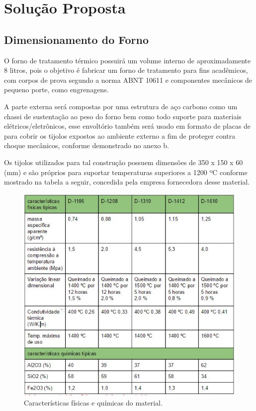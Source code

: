 \chapter[Solução Proposta]{Solução Proposta}


\section{Dimensionamento do Forno}

O forno de tratamento térmico possuirá um volume interno de aproximadamente 8 litros, pois o objetivo é fabricar um forno de tratamento para fins acadêmicos, com corpos de prova segundo a norma ABNT 10611 e componentes mecânicos de pequeno porte, como engrenagens.
 
A parte externa será compostas por uma estrutura de aço carbono como um chassi de sustentação ao peso do forno bem como todo suporte para materiais elétricos/eletrônicos, esse envoltório também será usado em formato de placas de para cobrir os tijolos expostos ao ambiente externo a fim de proteger contra choque mecânicos, conforme demonstrado no anexo b.

Os tijolos utilizados para tal construção possuem dimensões de 350 x 150 x 60 (mm) e são próprios para suportar temperaturas superiores a 1200 ºC conforme mostrado na tabela a seguir, concedida pela empresa fornecedora desse material.

\begin{figure}[!ht]
	\centering
	\label{tabela_dimensoes}
	\includegraphics[keepaspectratio=true,scale=0.7]{figuras/tabela_dimensoes.JPG}
	\caption{Características físicas e químicas do material.}
\end{figure}

